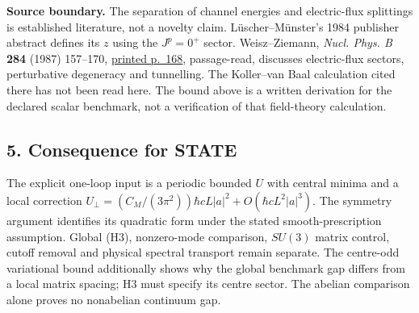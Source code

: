 \documentclass[11pt,a4paper]{article}
\begin{document}
\textbf{Source boundary.} The separation of channel energies and
electric-flux splittings is established literature, not a novelty claim.
Lüscher--Münster's 1984 publisher abstract defines its \(z\) using the
\(J^p=0^+\) sector. Weisz--Ziemann, \emph{Nucl. Phys. B} \textbf{284}
(1987) 157--170,
\href{https://www-library.desy.de/preparch/desy/postpr/1986/desy86-109.pdf}{printed
p.~168}, passage-read, discusses electric-flux sectors, perturbative
degeneracy and tunnelling. The Koller--van Baal calculation cited there
has not been read here. The bound above is a written derivation for the
declared scalar benchmark, not a verification of that field-theory
calculation.

\hypertarget{consequence-for-state}{%
\subsection{5. Consequence for STATE}\label{consequence-for-state}}

The explicit one-loop input is a periodic bounded \(U\) with central
minima and a local correction
\(U_\perp=(C_M/(3\pi^2))\hbar cL|a|^2+O(\hbar cL^2|a|^3)\). The symmetry
argument identifies its quadratic form under the stated
smooth-prescription assumption. Global (H3), nonzero-mode comparison,
\(SU(3)\) matrix control, cutoff removal and physical spectral transport
remain separate. The centre-odd variational bound additionally shows why
the global benchmark gap differs from a local matrix spacing; H3 must
specify its centre sector. The abelian comparison alone proves no
nonabelian continuum gap.
\end{document}
